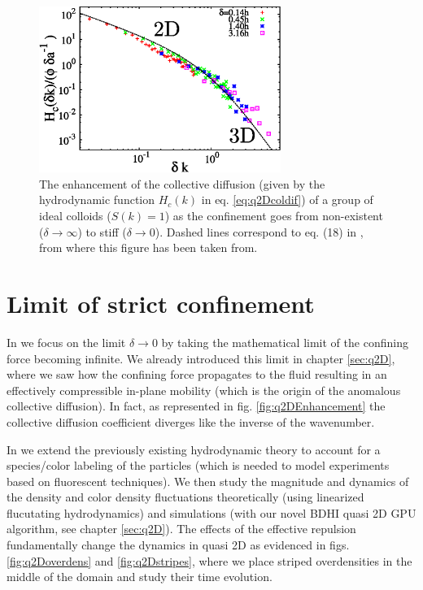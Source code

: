\documentclass[ twoside,openright,titlepage,numbers=noenddot,%
headinclude,footinclude,cleardoublepage=empty,abstract=on,
BCOR=5mm,paper=a4,fontsize=11pt, dvipsnames
]{scrreprt}
\newcommand{\gpu}{\gls{GPU}\xspace}
\begin{document}
  \begin{figure}[H]
    \label{fig:q2Dfrom3dto2d}
    \centering
    \includegraphics[width=0.7\textwidth]{gfx/q2Dfrom3dto2d}
    \caption{The enhancement of the collective diffusion (given by the hydrodynamic function $H_c(k)$ in eq. \ref{eq:q2Dcoldif}) of a group of ideal colloids ($S(k)=1$) as the confinement goes from non-existent ($\delta\rightarrow \infty$) to stiff ($\delta\rightarrow 0$). Dashed lines correspond to eq. (18) in \cite{Pelaez2017}, from where this figure has been taken from.}
  \end{figure}


\section{Limit of strict confinement}  
In \cite{Pelaez2018} we focus on the limit $\delta\rightarrow 0$ by taking the mathematical limit of the confining force becoming infinite. We already introduced this limit in chapter \ref{sec:q2D}, where we saw how the confining force propagates to the fluid resulting in an effectively compressible in-plane mobility (which is the origin of the anomalous collective diffusion). In fact, as represented in fig. \ref{fig:q2DEnhancement} the collective diffusion coefficient diverges like the inverse of the wavenumber.

In \cite{Pelaez2018} we extend the previously existing hydrodynamic theory to account for a species/color labeling of the particles (which is needed to model experiments based on fluorescent techniques). We then study the magnitude and dynamics of the density and color density fluctuations theoretically (using linearized flucutating hydrodynamics) and simulations (with our novel \gls{BDHI} quasi 2D \gpu algorithm, see chapter \ref{sec:q2D}).
The effects of the effective repulsion fundamentally change the dynamics in quasi 2D as evidenced in figs. \ref{fig:q2Doverdens} and \ref{fig:q2Dstripes}, where we place striped overdensities in the middle of the domain and study their time evolution.
\end{document}
